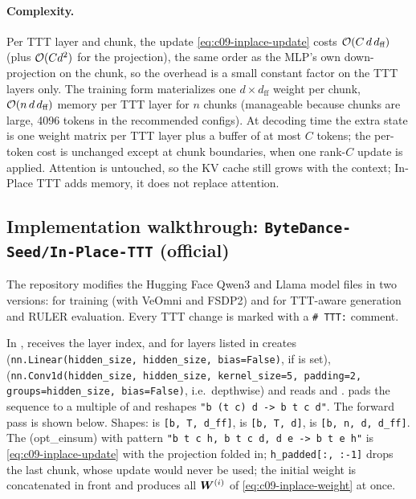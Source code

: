 \paragraph{Complexity.} Per TTT layer and chunk, the update \eqref{eq:c09-inplace-update} costs
$\mathcal{O}(C\, d\, d_{\text{ff}})$ (plus $\mathcal{O}(C d^2)$ for the projection), the same order as the
MLP's own down-projection on the chunk, so the overhead is a small constant factor on the TTT
layers only. The training form materializes one $d\times d_{\text{ff}}$ weight per chunk,
$\mathcal{O}(n\, d\, d_{\text{ff}})$ memory per TTT layer for $n$ chunks (manageable because chunks are
large, 4096 tokens in the recommended configs). At decoding time the extra state is one weight
matrix per TTT layer plus a buffer of at most $C$ tokens; the per-token cost is unchanged
except at chunk boundaries, when one rank-$C$ update is applied. Attention is untouched, so the
KV cache still grows with the context; In-Place TTT adds memory, it does not replace attention.

\subsection{Implementation walkthrough: \texttt{ByteDance-Seed/In-Place-TTT} (official)}

The repository  modifies the Hugging Face Qwen3 and Llama
model files in two versions:  for training (with VeOmni and FSDP2) and
 for TTT-aware generation and RULER evaluation. Every TTT change is
marked with a \texttt{\# TTT:} comment.

\begin{implnote}[title={In the code: the TTT MLP (training version)}]
In ,  receives the layer index,
and for layers listed in  creates 
(\texttt{nn.Linear(hidden\_size, hidden\_size, bias=False)}, if  is set),
 (\texttt{nn.Conv1d(hidden\_size, hidden\_size, kernel\_size=5, padding=2,
groups=hidden\_size, bias=False)}, i.e.\ depthwise) and reads  and .
 pads the sequence to a multiple of  and reshapes
\texttt{"b (t c) d -> b t c d"}. The forward pass is shown below. Shapes:  is
\texttt{[b, T, d\_ff]},  is \texttt{[b, T, d]},  is
\texttt{[b, n, d, d\_ff]}. The  (opt\_einsum) with pattern
\texttt{"b t c h, b t c d, d e -> b t e h"} is \eqref{eq:c09-inplace-update} with the projection
folded in; \texttt{h\_padded[:, :-1]} drops the last chunk, whose update would never be used;
the initial weight is concatenated in front and  produces all
$\bm{W}^{(i)}$ of \eqref{eq:c09-inplace-weight} at once.
\end{implnote}

